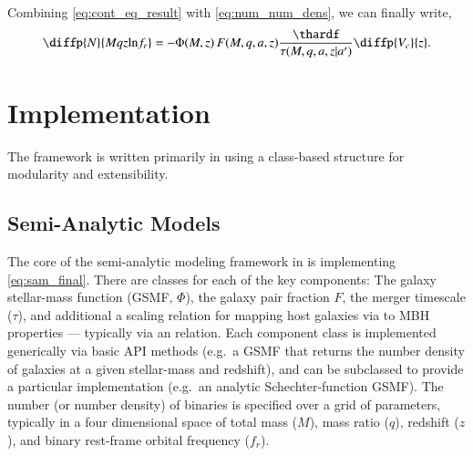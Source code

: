         Combining \eqref{eq:cont_eq_result} with \eqref{eq:num_num_dens}, we can finally write,
        \begin{equation}
            \label{eq:sam_final}
            \diffp{N}{{M}{q}{z}{\ln\!f_r}} = - \Phi(M,z) \, F(M,q,a,z) \frac{\thardf}{\tau(M,q,a,z|a')} \diffp{V_c}{z}.
        \end{equation}



\section{Implementation}
    \label{sec:imp}

    The \holodeck{} framework is written primarily in \python{} using a class-based structure for modularity and extensibility.

    \subsection{Semi-Analytic Models}
        \label{sec:imp_sam}

        The core of the semi-analytic modeling framework in \holodeck{} is implementing \eqref{eq:sam_final}.  There are classes for each of the key components: The galaxy stellar-mass function (GSMF, $\Phi$), the galaxy pair fraction \(F\), the merger timescale ($\tau$), and additional a scaling relation for mapping host galaxies via to MBH properties --- typically via an \mmbulge{} relation.  Each component class is implemented generically via basic API methods (e.g.~a GSMF that returns the number density of galaxies at a given stellar-mass and redshift), and can be subclassed to provide a particular implementation (e.g.~an analytic Schechter-function GSMF).  The number (or number density) of binaries is specified over a grid of parameters, typically in a four dimensional space of total mass ($M$), mass ratio ($q$), redshift ($z$), and binary rest-frame orbital frequency ($f_r$).

